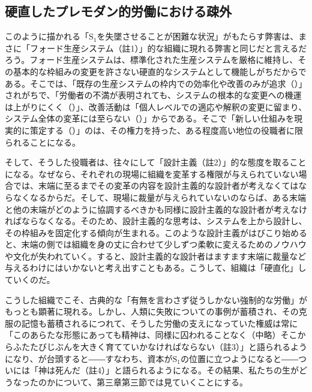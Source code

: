 \subsection{硬直したプレモダン的労働における疎外}\label{ux786cux76f4ux3057ux305fux30d7ux30ecux30e2ux30c0ux30f3ux7684ux52b4ux50cdux306bux304aux3051ux308bux758eux5916}

このように描かれる「\(\textrm{S}_1\)を失墜させることが困難な状況」がもたらす弊害は、まさに「フォード生産システム（註1）」的な組織に現れる弊害と同じだと言えるだろう。フォード生産システムは、標準化された生産システムを厳格に維持し、その基本的な枠組みの変更を許さない硬直的なシステムとして機能しがちだからである。そこでは、「既存の生産システムの枠内での効率化や改善のみが追求（）」されがちで、「労働者の不満が表明されても、システムの根本的な変更への機運は上がりにくく（）」、改善活動は「個人レベルでの適応や解釈の変更に留まり、システム全体の変革には至らない（）」からである。そこで「新しい仕組みを現実的に策定する（）」のは、その権力を持った、ある程度高い地位の役職者に限られることになる。

そして、そうした役職者は、往々にして「設計主義（註2）」的な態度を取ることになる。なぜなら、それぞれの現場に組織を変革する権限が与えられていない場合では、末端に至るまでその変革の内容を設計主義的な設計者が考えなくてはならなくなるからだ。そして、現場に裁量が与えられていないのならば、ある末端と他の末端がどのように協調するべきかも同様に設計主義的な設計者が考えなければならなくなる。そのため、設計主義的な思考は、システムを上から設計し、その枠組みを固定化する傾向が生まれる。このような設計主義がはびこり始めると、末端の側では組織を身の丈に合わせて少しずつ柔軟に変えるためのノウハウや文化が失われていく。すると、設計主義的な設計者はますます末端に裁量など与えるわけにはいかないと考え出すこともある。こうして、組織は「硬直化」していくのだ。

こうした組織でこそ、古典的な「有無を言わさず従うしかない強制的な労働」がもっとも顕著に現れる。しかし、人類に失敗についての事例が蓄積され、その克服の記憶も蓄積されるにつれて、そうした労働の支えになっていた権威は常に「このあらたな形態にあっても精神は、同様に囚われることなく（中略）そこからふたたびじぶんを大きく育てていかなければならない（註3）」と語られるようになり、が台頭すると――すなわち、資本が\(\textrm{S}_1\)の位置に立つようになると――ついには「神は死んだ（註4）」と語られるようになる。その結果、私たちの生がどうなったのかについて、第三章第三節では見ていくことにする。

